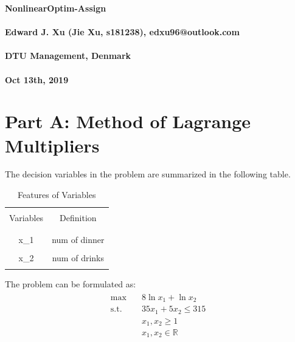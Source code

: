 \documentclass[fleqn,10pt]{wlscirep}
\begin{document}
\flushbottom
{\noindent \LARGE \textbf{NonlinearOptim-Assign}} \\
\\[-1em]
{\noindent \textbf{Edward J. Xu (Jie Xu, s181238), edxu96@outlook.com}} \\
\\[-1em]
{\noindent \textbf{DTU Management, Denmark}} \\
\\[-1em]
{\noindent \textbf{Oct 13th, 2019}}


\section{Part A: Method of Lagrange Multipliers}

The decision variables in the problem are summarized in the following table.

\begin{table}[ht]
    \centering
    \begin{tabular}{C C}
        \hline
        \\[-1em]
        Variables & Definition \\
        \\[-1em]
        \hline
        \\[-1em]
        x_{1} & num of dinner \\
        \\[-1em]
        x_{2} & num of drinks \\
        \\[-1em]
        \hline
    \end{tabular}
    \caption{Features of Variables}
    \label{tab:1}
\end{table}
\FloatBarrier

The problem can be formulated as:
\begin{align} \begin{split}
    \max \quad & 8 \ln{x_{1}} + \ln{x_{2}} \\
    \text{s.t.} \quad & 35 x_{1} + 5 x_{2} \leq 315 \\
    & x_{1}, x_{2} \geq 1 \\
    & x_{1}, x_{2} \in \mathbb{R} \\
\end{split} \end{align} 
\end{document}
